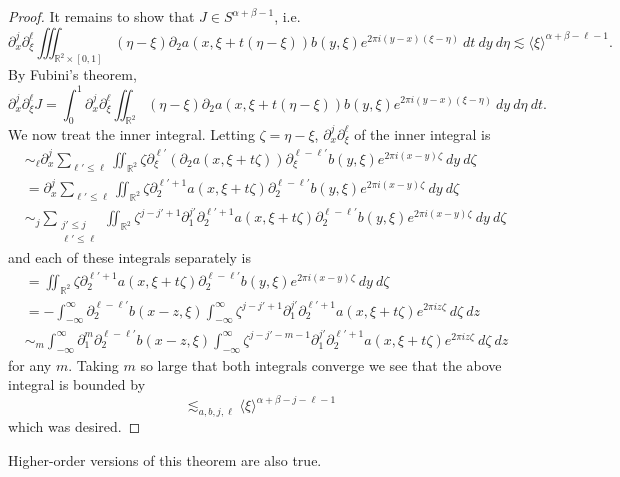 \documentclass[12pt]{report}
\newcommand{\RR}{\mathbb{R}}
\theoremstyle{definition}
\begin{document}
\begin{proof}
It remains to show that $J \in S^{\alpha + \beta - 1}$, i.e.
$$\partial_x^j \partial_\xi^\ell \iiint_{\RR^2 \times [0, 1]} (\eta - \xi)\partial_2a(x, \xi + t(\eta - \xi)) b(y, \xi) e^{2\pi i(y-x)(\xi - \eta)} ~dt ~dy ~d\eta \lesssim \langle \xi \rangle^{\alpha + \beta - \ell - 1}.$$
By Fubini's theorem,
$$\partial_x^j \partial_\xi^\ell J = \int_0^1 \partial_x^j \partial_\xi^\ell \iint_{\RR^2}(\eta - \xi)\partial_2a(x, \xi + t(\eta - \xi)) b(y, \xi) e^{2\pi i(y-x)(\xi - \eta)} ~dy ~d\eta ~dt.$$
We now treat the inner integral. Letting $\zeta = \eta - \xi$, $\partial_x^j \partial_\xi^\ell$ of the inner integral is
\begin{align*}
&\sim_\ell \partial_x^j \sum_{\ell' \leq \ell} \iint_{\RR^2} \zeta \partial_\xi^{\ell'}(\partial_2a(x, \xi + t\zeta)) \partial_\xi^{\ell - \ell'}b(y, \xi)e^{2\pi i(x-y)\zeta}~dy~d\zeta\\
&= \partial_x^j \sum_{\ell' \leq \ell} \iint_{\RR^2} \zeta \partial_2^{\ell' + 1} a(x, \xi + t\zeta)\partial_2^{\ell - \ell'} b(y, \xi) e^{2\pi i(x-y)\zeta} ~dy~d\zeta\\
&\sim_j \sum_{\substack{j' \leq j\\\ell' \leq \ell}} \iint_{\RR^2} \zeta^{j-j'+1} \partial_1^{j'} \partial_2^{\ell' + 1} a(x, \xi + t\zeta) \partial_2^{\ell - \ell'} b(y, \xi) e^{2\pi i(x-y)\zeta} ~dy ~d\zeta
\end{align*}
and each of these integrals separately is
\begin{align*}
&= \iint_{\RR^2} \zeta \partial_2^{\ell' + 1} a(x, \xi + t\zeta)\partial_2^{\ell - \ell'} b(y, \xi) e^{2\pi i(x-y)\zeta} ~dy~d\zeta\\
&= -\int_{-\infty}^\infty \partial_2^{\ell - \ell'} b(x - z, \xi) \int_{-\infty}^\infty \zeta^{j - j' + 1} \partial_1^{j'} \partial_2^{\ell' + 1} a(x, \xi + t\zeta) e^{2\pi iz\zeta} ~d\zeta ~dz\\
&\sim_m \int_{-\infty}^\infty \partial_1^m \partial_2^{\ell - \ell'} b(x - z, \xi) \int_{-\infty}^\infty \zeta^{j-j'-m-1} \partial_1^{j'}\partial_2^{\ell' + 1} a(x, \xi + t\zeta) e^{2\pi iz\zeta} ~d\zeta ~dz
\end{align*}
for any $m$. Taking $m$ so large that both integrals converge we see that the above integral is bounded by
$$\lesssim_{a,b,j,\ell} \langle \xi \rangle^{\alpha + \beta - j - \ell - 1}$$
which was desired.
\end{proof}

Higher-order versions of this theorem are also true.
\end{document}
